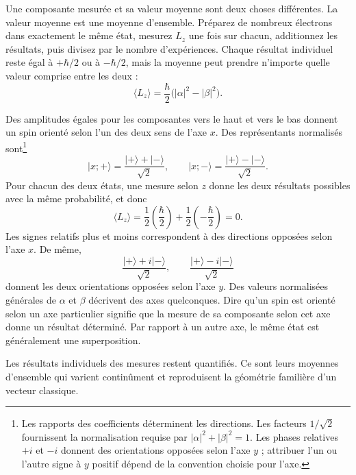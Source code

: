 Une composante mesurée et sa valeur moyenne sont deux choses différentes. La valeur moyenne est une moyenne d’ensemble. Préparez de nombreux électrons dans exactement le même état, mesurez \(L_z\) une fois sur chacun, additionnez les résultats, puis divisez par le nombre d’expériences. Chaque résultat individuel reste égal à \(+\hbar/2\) ou à \(-\hbar/2\), mais la moyenne peut prendre n’importe quelle valeur comprise entre les deux :
\begin{equation}
\langle L_z\rangle
=
\frac{\hbar}{2}\bigl(|\alpha|^2-|\beta|^2\bigr).
\end{equation}

Des amplitudes égales pour les composantes vers le haut et vers le bas donnent un spin orienté selon l’un des deux sens de l’axe \(x\). Des représentants normalisés sont\footnote{Les rapports des coefficients déterminent les directions. Les facteurs \(1/\sqrt2\) fournissent la normalisation requise par \( |\alpha|^2+|\beta|^2=1\). Les phases relatives \(+i\) et \(-i\) donnent des orientations opposées selon l’axe \(y\) ; attribuer l’un ou l’autre signe à \(y\) positif dépend de la convention choisie pour l’axe.}
\begin{equation}
\lvert x;+\rangle
=
\frac{\lvert+\rangle+\lvert-\rangle}{\sqrt2},
\qquad
\lvert x;-\rangle
=
\frac{\lvert+\rangle-\lvert-\rangle}{\sqrt2}.
\end{equation}
Pour chacun des deux états, une mesure selon \(z\) donne les deux résultats possibles avec la même probabilité, et donc
\begin{equation}
\langle L_z\rangle
=
\frac12\left(\frac{\hbar}{2}\right)
+
\frac12\left(-\frac{\hbar}{2}\right)
=0.
\end{equation}
Les signes relatifs plus et moins correspondent à des directions opposées selon l’axe \(x\). De même,
\begin{equation}
\frac{\lvert+\rangle+i\lvert-\rangle}{\sqrt2},
\qquad
\frac{\lvert+\rangle-i\lvert-\rangle}{\sqrt2}
\end{equation}
donnent les deux orientations opposées selon l’axe \(y\). Des valeurs normalisées générales de \(\alpha\) et \(\beta\) décrivent des axes quelconques. Dire qu’un spin est orienté selon un axe particulier signifie que la mesure de sa composante selon cet axe donne un résultat déterminé. Par rapport à un autre axe, le même état est généralement une superposition.

Les résultats individuels des mesures restent quantifiés. Ce sont leurs moyennes d’ensemble qui varient continûment et reproduisent la géométrie familière d’un vecteur classique.

